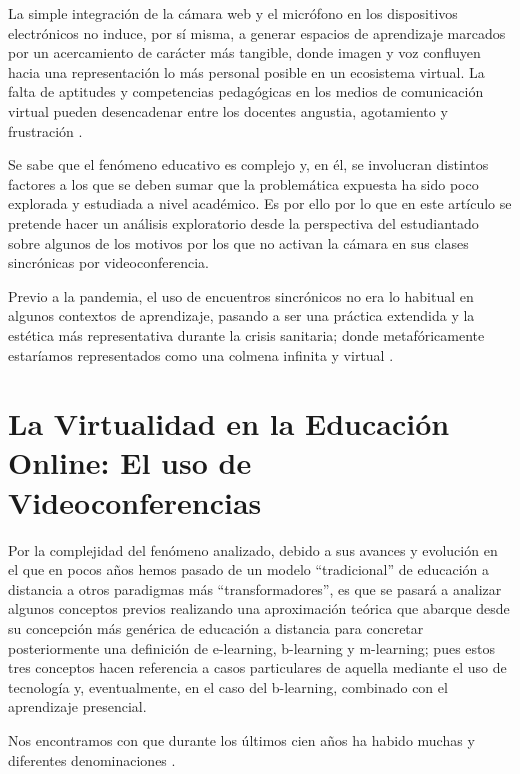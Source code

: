 \documentclass[spanish]{textolivre}
\begin{document}
La simple integración de la cámara web y el micrófono en los dispositivos electrónicos no induce, por sí misma, a generar espacios de aprendizaje marcados por un acercamiento de carácter más tangible, donde imagen y voz confluyen hacia una representación lo más personal posible en un ecosistema virtual. La falta de aptitudes y competencias pedagógicas en los medios de comunicación virtual pueden desencadenar entre los docentes angustia, agotamiento y frustración \cite{rivera_olguin_disrupcion_2021}.

Se sabe que el fenómeno educativo es complejo y, en él, se involucran distintos factores a los que se deben sumar que la problemática expuesta ha sido poco explorada y estudiada a nivel académico. Es por ello por lo que en este artículo se pretende hacer un análisis exploratorio desde la perspectiva del estudiantado sobre algunos de los motivos por los que no activan la cámara en sus clases sincrónicas por videoconferencia.

Previo a la pandemia, el uso de encuentros sincrónicos no era lo habitual en algunos contextos de aprendizaje, pasando a ser una práctica extendida y la estética más representativa durante la crisis sanitaria; donde metafóricamente estaríamos representados como una colmena infinita y virtual \cite{carrion_estetica_2020}.

\section{La Virtualidad en la Educación Online: El uso de Videoconferencias}\label{sec-virtualidad}

Por la complejidad del fenómeno analizado, debido a sus avances y evolución en el que en pocos años hemos pasado de un modelo “tradicional” de educación a distancia a otros paradigmas más “transformadores”, es que se pasará a analizar algunos conceptos previos realizando una aproximación teórica que abarque desde su concepción más genérica de educación a distancia para concretar posteriormente una definición de e-learning, b-learning y m-learning; pues estos tres conceptos hacen referencia a casos particulares de aquella mediante el uso de tecnología y, eventualmente, en el caso del b-learning, combinado con el aprendizaje presencial.

Nos encontramos con que durante los últimos cien años ha habido muchas y diferentes denominaciones \cite{ruiperez_educacion_2003}.
\end{document}
